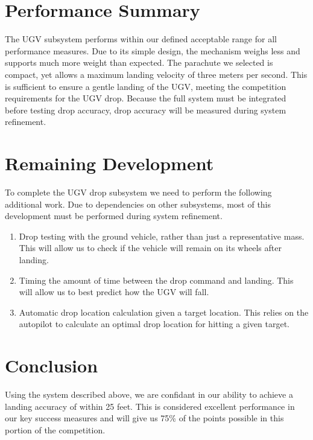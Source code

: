 \documentclass[]{auvsi_doc}
\begin{document}
\section{Performance Summary}
The UGV subsystem performs within our defined acceptable range for all performance measures.
Due to its simple design, the mechanism weighs less and supports much more weight than expected. 
The parachute we selected is compact, yet allows a maximum landing velocity of three meters per second. This is sufficient to ensure a gentle landing of the UGV, meeting the competition requirements for the UGV drop. Because the full system must be integrated before testing drop accuracy, drop accuracy will be measured during system refinement.

\section{Remaining Development}
To complete the UGV drop subsystem we need to perform the following additional work. Due to dependencies on other subsystems, most of this development must be performed during system refinement.
\begin{enumerate}
	\item{Drop testing with the ground vehicle, rather than just a representative mass. This will allow us to check if the vehicle will remain on its wheels after landing.}
	\item{Timing the amount of time between the drop command and landing. This will allow us to best predict how the UGV will fall.}
	\item{Automatic drop location calculation given a target location. This relies on the autopilot to calculate an optimal drop location for hitting a given target.}
\end{enumerate}

\section{Conclusion}
Using the system described above, we are confidant in our ability to achieve a landing accuracy of within 25 feet. This is considered excellent performance in our key success measures and will give us 75\% of the points possible in this portion of the competition. 
\end{document}
